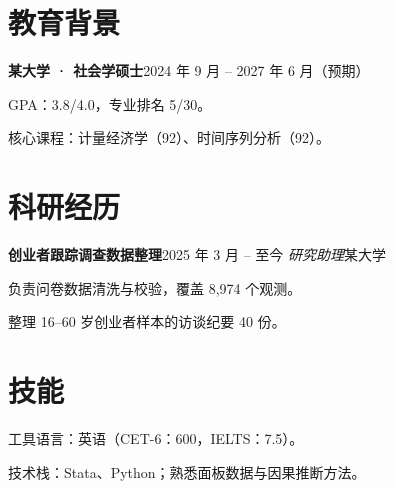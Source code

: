 \documentclass{article}
\newcommand{\resumesection}[1]{\section*{#1}}
\newcommand{\resumeentry}[2]{\textbf{#1}\hfill{#2}}
\newcommand{\resumesubentry}[2]{\textit{#1}\hfill{#2}}
\begin{document}
\resumesection{教育背景}
\resumeentry{某大学 · 社会学硕士}{2024 年 9 月 -- 2027 年 6 月（预期）}
\item GPA：3.8/4.0，专业排名 5/30。
\item 核心课程：计量经济学（92）、时间序列分析（92）。

\resumesection{科研经历}
\resumeentry{创业者跟踪调查数据整理}{2025 年 3 月 -- 至今}
\resumesubentry{研究助理}{某大学}
\item 负责问卷数据清洗与校验，覆盖 8,974 个观测。
\item 整理 16--60 岁创业者样本的访谈纪要 40 份。

\resumesection{技能}
\item 工具语言：英语（CET-6：600，IELTS：7.5）。
\item 技术栈：Stata、Python；熟悉面板数据与因果推断方法。
\end{document}
